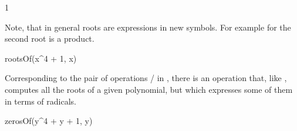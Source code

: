 {{{{{{{{{{{\begin{xtc}
\begin{TeXOutput}
\end{TeXOutput}
\end{xtc}
\begin{xtc}
\begin{xtccomment}
\end{xtccomment}
\begin{spadsrc}
\end{spadsrc}
\begin{TeXOutput}
\begin{fricasmath}{8}
1%
\end{fricasmath}
\end{TeXOutput}
\end{xtc}
\begin{xtc}
\begin{xtccomment}
Note, that in general roots are expressions in new symbols. For
example for  the second root is a product.
\end{xtccomment}
\begin{spadsrc}
rootsOf(x^4 + 1, x)
\end{spadsrc}
\begin{TeXOutput}
\begin{fricasmath}{9}
%
\end{fricasmath}
\end{TeXOutput}
\end{xtc}
\begin{xtc}
\begin{xtccomment}
Corresponding to the pair of operations
/ in
, there is
an operation  that, like ,
computes all the roots
of a given polynomial, but which expresses some of them in terms of
radicals.
\end{xtccomment}
\begin{spadsrc}
zerosOf(y^4 + y + 1, y) 
\end{spadsrc}
\begin{TeXOutput}
\begin{fricasmath}{10}
\end{fricasmath}
\end{TeXOutput}
\end{xtc}}}}}}}}}}}}
